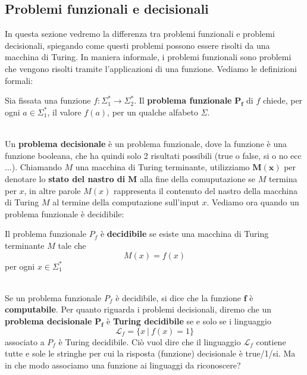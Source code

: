\subsection{Problemi funzionali e decisionali}
In questa sezione vedremo la differenza tra problemi funzionali e problemi decisionali, spiegando come questi problemi possono essere risolti da una macchina di Turing. In maniera informale, i problemi funzionali sono problemi che vengono risolti
tramite l'applicazioni di una funzione. Vediamo le definizioni formali:\smallskip\\
\colorbox{SALZO}{\parbox{\dimexpr\linewidth-2\fboxsep}{\begin{definition}
   Sia fissata una funzione $f: \Sigma_1^* \to \Sigma_2^*$. Il \textbf{problema funzionale} $\bm{P_f}$ di $f$ chiede, per ogni $a \in \Sigma_1^*$, il valore $f(a)$, per un qualche alfabeto $\Sigma$.
\end{definition}}}\smallskip\\ \label{deci}
Un \textbf{problema decisionale} è un problema funzionale, dove la funzione è una funzione booleana, che ha quindi solo 2 risultati possibili (true o false, si o no ecc$\ldots$). Chiamando $M$ una macchina di Turing terminante, utilizziamo $\bm{M(x)}$
per denotare lo \textbf{stato del nastro di} $\bm{M}$ alla fine della comuputazione se $M$ termina per $x$, in altre parole $M(x)$ rappresenta il contenuto del nastro della macchina di Turing $M$ al termine della computazione sull'input $x$.
Vediamo ora quando un problema funzionale è decidibile:\smallskip\\
\colorbox{SALZO}{\parbox{\dimexpr\linewidth-2\fboxsep}{\begin{definition}
   Il problema funzionale $P_f$ è \textbf{decidibile} se esiste una macchina di Turing terminante $M$ tale che 
   \[   M(x) = f(x)   \]
   per ogni $x \in \Sigma_1^*$
\end{definition}}}\smallskip\\
Se un problema funzionale $P_f$ è decidibile, si dice che la funzione $\bm{f}$ è \textbf{computabile}. Per quanto riguarda i problemi decisionali, diremo che un \textbf{problema decisionale} $\bm{P_f}$ è \textbf{Turing decidibile} se e solo se i linguaggio
\[  \mathcal{L}_f  = \{  x \ |\  f(x)  = 1   \}     \]
associato a $P_f$ è Turing decidibile. Ciò vuol dire che il linguaggio $\mathcal{L}_f$ contiene tutte e sole le stringhe per cui la risposta (funzione) decisionale è true/1/si. Ma in che modo associamo una funzione ai linguaggi da riconoscere?\smallskip\\
